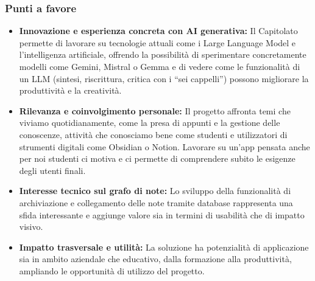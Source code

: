 \documentclass[a4paper,12pt]{article}
\begin{document}
\subsubsection{Punti a favore}
\begin{itemize}
    \item \textbf{Innovazione e esperienza concreta con AI generativa:} Il Capitolato permette di lavorare su tecnologie attuali come i Large Language Model e l’intelligenza artificiale, offrendo la possibilità di sperimentare concretamente modelli come Gemini, Mistral o Gemma e di vedere come le funzionalità di un LLM (sintesi, riscrittura, critica con i “sei cappelli”) possono migliorare la produttività e la creatività.
    \item \textbf{Rilevanza e coinvolgimento personale:} Il progetto affronta temi che viviamo quotidianamente, come la presa di appunti e la gestione delle conoscenze, attività che conosciamo bene come studenti e utilizzatori di strumenti digitali come Obsidian o Notion. Lavorare su un’app pensata anche per noi studenti ci motiva e ci permette di comprendere subito le esigenze degli utenti finali.
    \item \textbf{Interesse tecnico sul grafo di note:} Lo sviluppo della funzionalità di archiviazione e collegamento delle note tramite database rappresenta una sfida interessante e aggiunge valore sia in termini di usabilità che di impatto visivo.
    \item \textbf{Impatto trasversale e utilità:} La soluzione ha potenzialità di applicazione sia in ambito aziendale che educativo, dalla formazione alla produttività, ampliando le opportunità di utilizzo del progetto.
\end{itemize}
\end{document}
